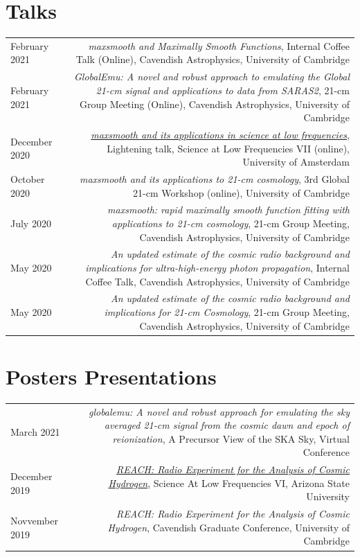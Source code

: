 \documentclass[12pt]{article}
\begin{document}
	\section*{Talks}
	\begin{tabular}{L!{\vrule}R}
		February 2021 & \textit{maxsmooth and Maximally Smooth Functions}, Internal Coffee Talk (Online), Cavendish Astrophysics, University of Cambridge \\
		February 2021 & \textit{GlobalEmu: A novel and robust approach to emulating the Global 21-cm signal and applications to data from SARAS2}, 21-cm Group Meeting (Online), Cavendish Astrophysics, University of Cambridge \\
		December 2020 & \href{https://www.youtube.com/watch?v=Yw6_IInwTNE}{\textit{maxsmooth and its applications in science at low frequencies}}, Lightening talk, Science at Low Frequencies VII (online), University of Amsterdam \\
		October 2020 & \textit{maxsmooth and its applications to 21-cm cosmology}, 3rd Global 21-cm Workshop (online), University of Cambridge \\
		July 2020 & \textit{maxsmooth: rapid maximally smooth function fitting with applications to 21-cm cosmology}, 21-cm Group Meeting, Cavendish Astrophysics, University of Cambridge \\
		May 2020 & \textit{An updated estimate of the cosmic radio background and implications for ultra-high-energy photon propagation}, Internal Coffee Talk, Cavendish Astrophysics, University of Cambridge \\
		May 2020 & \textit{An updated estimate of the cosmic radio background and implications for 21-cm Cosmology}, 21-cm Group Meeting, Cavendish Astrophysics, University of Cambridge
	\end{tabular}

	\section*{Posters Presentations}
	
	\begin{tabular}{L!{\vrule}R}
		March 2021 & \textit{globalemu: A novel and robust approach for emulating the sky averaged 21-cm signal from the cosmic dawn and epoch of reionization}, A Precursor View of the SKA Sky, Virtual Conference\\
		December 2019 & \href{https://drive.google.com/file/d/1dvgumyu4cXxXqoYxikU3DKOa4u_gpGzn/view}{\textit{REACH: Radio Experiment for the Analysis of Cosmic Hydrogen}}, Science At Low Frequencies VI, Arizona State University \\
		Novvember 2019 & \textit{REACH: Radio Experiment for the Analysis of Cosmic Hydrogen}, Cavendish Graduate Conference, University of Cambridge
	\end{tabular}
	
\end{document}
